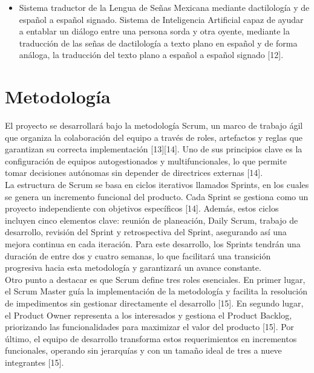 \begin{itemize}
\item Sistema traductor de la Lengua de Señas Mexicana mediante dactilología y de español a español signado. Sistema de Inteligencia Artificial capaz de ayudar a entablar un diálogo entre una persona sorda y otra oyente, mediante la traducción de las señas de dactilología a texto plano en español y de forma análoga, la traducción del texto plano a español a español signado [12].

	

\end{itemize}

\section{Metodología}
El proyecto se desarrollará bajo la metodología Scrum, un marco de trabajo ágil que organiza la colaboración del equipo a través de roles, artefactos y reglas que garantizan su correcta implementación [13][14]. Uno de sus principios clave es la configuración de equipos autogestionados y multifuncionales, lo que permite tomar decisiones autónomas sin depender de directrices externas [14].\\

La estructura de Scrum se basa en ciclos iterativos llamados Sprints, en los cuales se genera un incremento funcional del producto. Cada Sprint se gestiona como un proyecto independiente con objetivos específicos [14]. Además, estos ciclos incluyen cinco elementos clave: reunión de planeación, Daily Scrum, trabajo de desarrollo, revisión del Sprint y retrospectiva del Sprint, asegurando así una mejora continua en cada iteración. Para este desarrollo, los Sprints tendrán una duración de entre dos y cuatro semanas, lo que facilitará una transición progresiva hacia esta metodología y garantizará un avance constante.\\

Otro punto a destacar es que Scrum define tres roles esenciales. En primer lugar, el Scrum Master guía la implementación de la metodología y facilita la resolución de impedimentos sin gestionar directamente el desarrollo [15]. En segundo lugar, el Product Owner representa a los interesados y gestiona el Product Backlog, priorizando las funcionalidades para maximizar el valor del producto [15]. Por último, el equipo de desarrollo transforma estos requerimientos en incrementos funcionales, operando sin jerarquías y con un tamaño ideal de tres a nueve integrantes [15].\\

